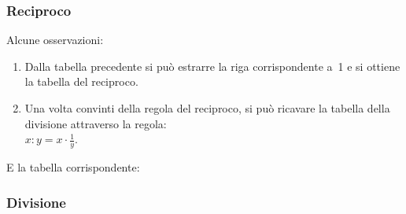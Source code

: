 \subsubsection{Reciproco}
\label{subsec:insnum_reciproco}

\begin{multicols}{2}
Alcune osservazioni:
\begin{enumerate} [noitemsep]
 \item Dalla tabella precedente si può estrarre la riga corrispondente a~1
e si ottiene la tabella del reciproco.
 \item Una volta convinti della regola del reciproco, si può ricavare la 
tabella della divisione attraverso la 
regola:\\
\(x : y = x \cdot \frac{1}{y}\).
\end{enumerate}
E la tabella corrispondente:
\begin{center}
\renewcommand{\arraystretch}{.0}
\end{center}
\end{multicols}

\newpage %

\subsubsection{Divisione}
\label{subsec:insnum_divisione}

